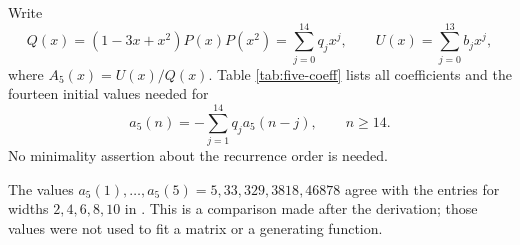 Write
\[
 Q(x)=(1-3x+x^2)P(x)P(x^2)=\sum_{j=0}^{14}q_jx^j,\qquad
 U(x)=\sum_{j=0}^{13}b_jx^j,
\]
where $A_5(x)=U(x)/Q(x)$.
Table \ref{tab:five-coeff} lists all coefficients and the
fourteen initial values needed for
\begin{equation}\label{eq:rec5}
 a_5(n)=-\sum_{j=1}^{14}q_j a_5(n-j),\qquad n\ge14.
\end{equation}
No minimality assertion about the recurrence order is needed.



The values $a_5(1),\ldots,a_5(5)=5,33,329,3818,46878$
agree with the entries for widths $2,4,6,8,10$ in
\cite[Table 12]{mathar2013}.
This is a comparison made after the derivation; those values
were not used to fit a matrix or a generating function.
